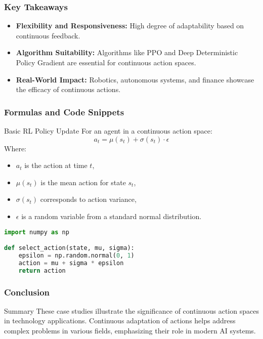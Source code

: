 \documentclass[aspectratio=169]{beamer}
\begin{document}
\begin{frame}[fragile]
    \frametitle{Key Takeaways}
    \begin{itemize}
        \item \textbf{Flexibility and Responsiveness:} High degree of adaptability based on continuous feedback.
        \item \textbf{Algorithm Suitability:} Algorithms like PPO and Deep Deterministic Policy Gradient are essential for continuous action spaces.
        \item \textbf{Real-World Impact:} Robotics, autonomous systems, and finance showcase the efficacy of continuous actions.
    \end{itemize}
\end{frame}

\begin{frame}[fragile]
    \frametitle{Formulas and Code Snippets}
    \begin{block}{Basic RL Policy Update}
        For an agent in a continuous action space:
        \begin{equation}
        a_t = \mu(s_t) + \sigma(s_t) \cdot \epsilon
        \end{equation}
        Where:
        \begin{itemize}
            \item \(a_t\) is the action at time \(t\),
            \item \(\mu(s_t)\) is the mean action for state \(s_t\),
            \item \(\sigma(s_t)\) corresponds to action variance,
            \item \(\epsilon\) is a random variable from a standard normal distribution.
        \end{itemize}
    \end{block}
    \begin{lstlisting}[language=Python]
import numpy as np

def select_action(state, mu, sigma):
    epsilon = np.random.normal(0, 1)
    action = mu + sigma * epsilon
    return action
    \end{lstlisting}
\end{frame}

\begin{frame}[fragile]
    \frametitle{Conclusion}
    \begin{block}{Summary}
        These case studies illustrate the significance of continuous action spaces in technology applications. Continuous adaptation of actions helps address complex problems in various fields, emphasizing their role in modern AI systems.
    \end{block}
\end{frame}
\end{document}

